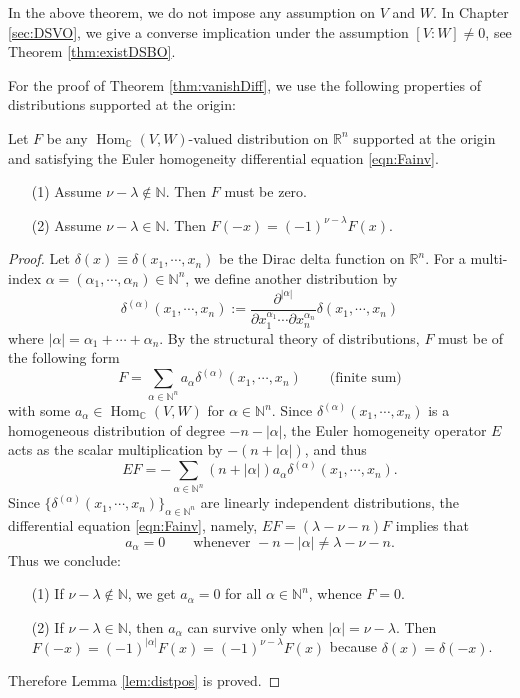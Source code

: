 \begin{remark}
In the above theorem, 
 we do not impose any assumption on $V$ and $W$.  
In Chapter \ref{sec:DSVO}, 
 we give a converse implication
 under the assumption $[V:W] \ne 0$, 
 see Theorem \ref{thm:existDSBO}.  
\end{remark}

For the proof of Theorem \ref{thm:vanishDiff}, 
 we use the following properties of distributions supported at the origin:
\begin{lemma}
\label{lem:distpos}
Let $F$ be any $\operatorname{Hom}_{{\mathbb{C}}}
 (V,W)$-valued distribution on ${\mathbb{R}}^n$
 supported at the origin
 and satisfying the Euler homogeneity differential equation \eqref{eqn:Fainv}.  
\begin{enumerate}
\item[{\rm{(1)}}]
Assume $\nu - \lambda \not \in {\mathbb{N}}$.  
Then $F$ must be zero. 
\item[{\rm{(2)}}]
Assume $\nu - \lambda \in {\mathbb{N}}$.  
Then $F(-x)=(-1)^{\nu -\lambda}F(x)$.   
\end{enumerate}
\end{lemma}
\begin{proof}
Let $\delta(x) \equiv \delta(x_1, \cdots, x_n)$ be the Dirac delta function 
on ${\mathbb{R}}^n$.  
For a multi-index $\alpha=(\alpha_1, \cdots, \alpha_n) \in {\mathbb{N}}^n$, 
 we define another distribution by 
\[
\delta^{(\alpha)}(x_1, \cdots, x_n)
:=
\frac{\partial^{|\alpha|}}{\partial x_1^{\alpha_1} \cdots \partial x_n^{\alpha_n}}  
\delta(x_1, \cdots, x_n)
\]
where $|\alpha|=\alpha_1+ \cdots +\alpha_n$.   
By the structural theory 
 of distributions,
 $F$ must be of the following form 
\[
   F=\sum_{\alpha \in {\mathbb{N}}^n} a_{\alpha} 
   \delta^{(\alpha)}(x_1,\cdots,x_n)
\qquad
\text{(finite sum)}
\]
with some $a_{\alpha} \in \operatorname{Hom}_{{\mathbb{C}}}
 (V,W)$
 for $\alpha \in {\mathbb{N}}^n$.  
Since $\delta^{(\alpha)}(x_1,\cdots,x_n)$ is 
 a homogeneous distribution
 of degree $-n-|\alpha|$, 
 the Euler homogeneity operator 
$E$ acts
 as the scalar multiplication
 by $-(n+|\alpha|)$, 
 and thus 
\[
  E F
  = 
  -\sum_{\alpha \in {\mathbb{N}}^n} 
  (n+|\alpha|)
   a_{\alpha} 
   \delta^{(\alpha)}(x_1,\cdots,x_n).  
\]
Since $\{ \delta^{(\alpha)}(x_1,\cdots,x_n) \}_{\alpha \in {\mathbb{N}}^n}$
 are linearly independent distributions,
 the differential equation \eqref{eqn:Fainv}, 
 namely, 
 $E F = (\lambda - \nu - n) F$
 implies that
\[
  a_{\alpha}=0
\qquad
\text{whenever }
  -n-|\alpha| \ne \lambda - \nu - n.  
\]
Thus we conclude:
\begin{enumerate}
\item[(1)]
If $\nu - \lambda \not \in {\mathbb{N}}$, 
 we get $a_{\alpha}=0$ 
 for all $\alpha \in {\mathbb{N}}^n$, 
 whence $F=0$.  
\item[(2)]
If $\nu - \lambda \in {\mathbb{N}}$, 
 then $a_{\alpha}$ can survive 
 only when $|\alpha|= \nu - \lambda$.  
Then $F(-x)=(-1)^{|\alpha|}F(x)=(-1)^{\nu - \lambda}F(x)$
 because $\delta(x)=\delta(-x)$.  
\end{enumerate}
Therefore Lemma \ref{lem:distpos} is proved.  
\end{proof}

